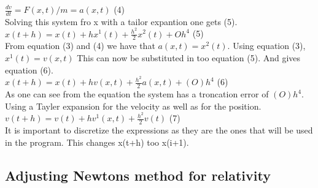 \documentclass{article}
\begin{document}
    $\frac{dv}{dt} = F(x,t)/m = a(x,t) $ (4) \\

    Solving this system fro x with a tailor expantion one gets (5).\\

    $x(t+h) = x(t) + hx^{1}(t) + \frac{h^{2}}{2} x^{2}(t) + Oh^{4}$ (5)\\

    From equation (3) and (4) we have that $a(x,t) = x^{2}(t)$. Using equation (3), $x^{1}(t) = v(x,t)$ This can now be substituted in too equation (5). And gives equation (6).  \\

    $x(t+h) = x(t) + h v(x,t) + \frac{h^{2}}{2} a(x,t) + (O)h^{4}$ (6) \\

    As one can see from the equation the system has a troncation error of $(O)h^{4}$.
    Using a Tayler expansion for the velocity as well as for the position. \\

    $v(t+h) = v(t) + h v^{1}(x,t) + \frac{h^{2}}{2}v(t) $ (7) \\

    It is important to discretize the expressions as they are the ones that will be used in the program. This changes x(t+h) too x(i+1). \\



\subsection{Adjusting Newtons method for relativity}








\end{document}
